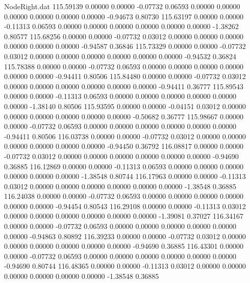 \begin{filecontents}{NodeRight.dat}
 115.59139    0.00000    0.00000    -0.07732    0.06593    0.00000    0.00000    0.00000    0.00000    0.00000    0.00000   -0.94673    0.80730
 115.63197    0.00000    0.00000    -0.11313    0.06593    0.00000    0.00000    0.00000    0.00000    0.00000    0.00000   -1.38262    0.80577
 115.68256    0.00000    0.00000    -0.07732    0.03012    0.00000    0.00000    0.00000    0.00000    0.00000    0.00000   -0.94587    0.36846
 115.73329    0.00000    0.00000    -0.07732    0.03012    0.00000    0.00000    0.00000    0.00000    0.00000    0.00000   -0.94532    0.36824
 115.78388    0.00000    0.00000    -0.07732    0.06593    0.00000    0.00000    0.00000    0.00000    0.00000    0.00000   -0.94411    0.80506
 115.84480    0.00000    0.00000    -0.07732    0.03012    0.00000    0.00000    0.00000    0.00000    0.00000    0.00000   -0.94411    0.36777
 115.89543    0.00000    0.00000    -0.11313    0.06593    0.00000    0.00000    0.00000    0.00000    0.00000    0.00000   -1.38140    0.80506
 115.93595    0.00000    0.00000    -0.04151    0.03012    0.00000    0.00000    0.00000    0.00000    0.00000    0.00000   -0.50682    0.36777
 115.98667    0.00000    0.00000    -0.07732    0.06593    0.00000    0.00000    0.00000    0.00000    0.00000    0.00000   -0.94411    0.80506
 116.03738    0.00000    0.00000    -0.07732    0.03012    0.00000    0.00000    0.00000    0.00000    0.00000    0.00000   -0.94450    0.36792
 116.08817    0.00000    0.00000    -0.07732    0.03012    0.00000    0.00000    0.00000    0.00000    0.00000    0.00000   -0.94690    0.36885
 116.12869    0.00000    0.00000    -0.11313    0.06593    0.00000    0.00000    0.00000    0.00000    0.00000    0.00000   -1.38548    0.80744
 116.17963    0.00000    0.00000    -0.11313    0.03012    0.00000    0.00000    0.00000    0.00000    0.00000    0.00000   -1.38548    0.36885
 116.24038    0.00000    0.00000    -0.07732    0.06593    0.00000    0.00000    0.00000    0.00000    0.00000    0.00000   -0.94454    0.80543
 116.29108    0.00000    0.00000    -0.11313    0.03012    0.00000    0.00000    0.00000    0.00000    0.00000    0.00000   -1.39081    0.37027
 116.34167    0.00000    0.00000    -0.07732    0.06593    0.00000    0.00000    0.00000    0.00000    0.00000    0.00000   -0.94863    0.80892
 116.39233    0.00000    0.00000    -0.07732    0.03012    0.00000    0.00000    0.00000    0.00000    0.00000    0.00000   -0.94690    0.36885
 116.43301    0.00000    0.00000    -0.07732    0.06593    0.00000    0.00000    0.00000    0.00000    0.00000    0.00000   -0.94690    0.80744
 116.48365    0.00000    0.00000    -0.11313    0.03012    0.00000    0.00000    0.00000    0.00000    0.00000    0.00000   -1.38548    0.36885

\end{filecontents}
